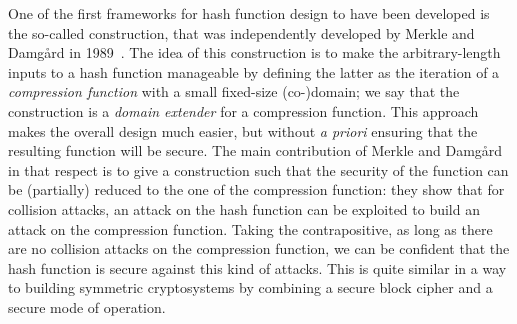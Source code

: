 One of the first frameworks for hash function design to have been developed is the so-called \merkdam construction, that was independently developed by
Merkle and Damg\aa rd in 1989~\cite{DBLP:conf/crypto/Merkle89a,DBLP:conf/crypto/Damgard89a}. The idea of this construction is to make the arbitrary-length
inputs to a hash function manageable by defining the latter as the iteration of a \emph{compression function} with a small fixed-size (co-)domain; we say
that the construction is a \emph{domain extender} for a compression function.
This approach makes the overall design much easier, but without \emph{a priori} ensuring that the resulting function will be secure. The main contribution of
Merkle and Damg\aa rd in that respect is to give a construction such that the security of the function can be (partially) reduced to the one of
the compression function: they show that for \eg collision attacks, an attack on the hash function can be exploited to build an attack on the compression function.
Taking the contrapositive, as long as there are no collision attacks on the compression function, we can be confident that the hash function is secure against this kind of attacks.
This is quite similar in a way to building symmetric cryptosystems by combining a secure block cipher and a secure mode of operation.

